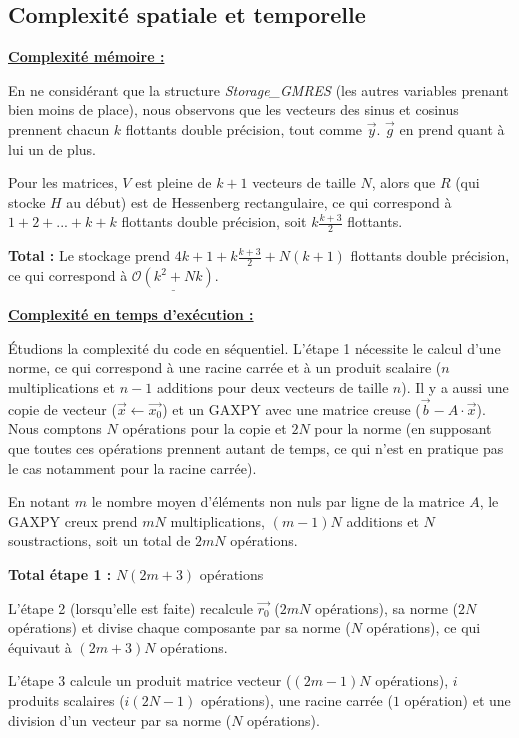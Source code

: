 \documentclass[11pt,a4paper,oneside]{memoir}
\theoremstyle{definition}
\theoremstyle{remark}
\theoremstyle{plain}
\begin{document}
\subsection{Complexité spatiale et temporelle}

\underline{\textbf{Complexité mémoire :}}

En ne considérant que la structure \textit{Storage\_GMRES} (les autres variables prenant bien moins de place), nous observons que les vecteurs des sinus et cosinus prennent chacun $k$ flottants double précision, tout comme $\vec{y}$. $\vec{g}$ en prend quant à lui un de plus.

Pour les matrices, $V$ est pleine de $k+1$ vecteurs de taille $N$, alors que $R$ (qui stocke $H$ au début) est de Hessenberg rectangulaire, ce qui correspond à $1+2+ ... + k + k$ flottants double précision, soit $k \frac{k+3}{2}$ flottants.

\textbf{Total :} Le stockage prend $4k+1+k \frac{k+3}{2} + N(k+1)$ flottants double précision, ce qui correspond à $\underline{\mathcal{O}(k^2 + Nk)}$.\medskip

\underline{\textbf{Complexité en temps d'exécution :}}

\'Etudions la complexité du code en séquentiel. L'étape 1 nécessite le calcul d'une norme, ce qui correspond à une racine carrée et à un produit scalaire ($n$ multiplications et $n-1$ additions pour deux vecteurs de taille $n$). Il y a aussi une copie de vecteur ($\vec{x} \leftarrow \vec{x_0}$) et un GAXPY avec une matrice creuse ($\vec{b} - A \cdot \vec{x}$). Nous comptons $N$ opérations pour la copie et $2N$ pour la norme (en supposant que toutes ces opérations prennent autant de temps, ce qui n'est en pratique pas le cas notamment pour la racine carrée).

En notant $m$ le nombre moyen d'éléments non nuls par ligne de la matrice $A$, le GAXPY creux prend $mN$ multiplications, $(m-1)N$ additions et $N$ soustractions, soit un total de $2mN$ opérations.

\textbf{Total étape 1 :} $N(2m+3)$ opérations\medskip

L'étape 2 (lorsqu'elle est faite) recalcule $\vec{r_0}$ ($2mN$ opérations), sa norme ($2N$ opérations) et divise chaque composante par sa norme ($N$ opérations), ce qui équivaut à $(2m+3)N$ opérations.

L'étape 3 calcule un produit matrice vecteur ($(2m-1)N$ opérations), $i$ produits scalaires ($i(2N-1)$ opérations), une racine carrée ($1$ opération) et une division d'un vecteur par sa norme ($N$ opérations).
\end{document}
